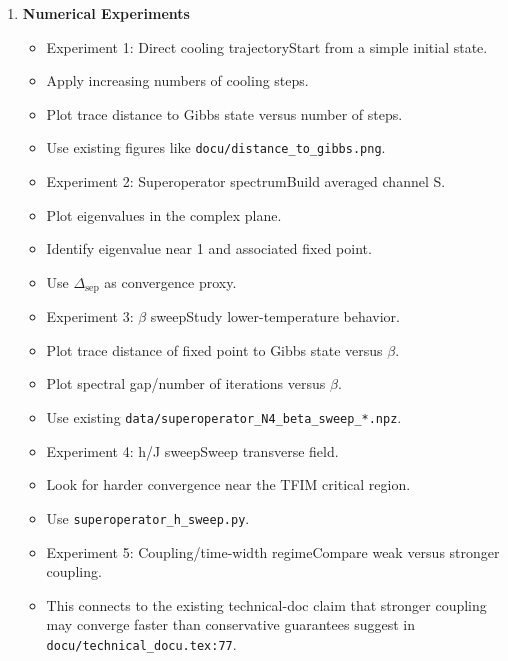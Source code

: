 \documentclass[11pt,a4paper]{article}
\begin{document}
\begin{itemize}
\begin{enumerate}
    \item \textbf{Numerical Experiments}
    \begin{itemize}
      \item Experiment 1: Direct cooling trajectoryStart from a simple initial state.
      \item Apply increasing numbers of cooling steps.
      \item Plot trace distance to Gibbs state versus number of steps.
      \item Use existing figures like \texttt{docu/distance\_to\_gibbs.png}.
      \item Experiment 2: Superoperator spectrumBuild averaged channel S.
      \item Plot eigenvalues in the complex plane.
      \item Identify eigenvalue near 1 and associated fixed point.
      \item Use $\Delta_{\mathrm{sep}}$ as convergence proxy.
      \item Experiment 3: $\beta$ sweepStudy lower-temperature behavior.
      \item Plot trace distance of fixed point to Gibbs state versus $\beta$.
      \item Plot spectral gap/number of iterations versus $\beta$.
      \item Use existing \texttt{data/superoperator\_N4\_beta\_sweep\_*.npz}.
      \item Experiment 4: h/J sweepSweep transverse field.
      \item Look for harder convergence near the TFIM critical region.
      \item Use \texttt{superoperator\_h\_sweep.py}.
      \item Experiment 5: Coupling/time-width regimeCompare weak versus stronger coupling.
      \item This connects to the existing technical-doc claim that stronger coupling may converge faster than conservative guarantees suggest in \texttt{docu/technical\_docu.tex:77}.
    \end{itemize}


\end{enumerate}
\end{itemize}
\end{document}
